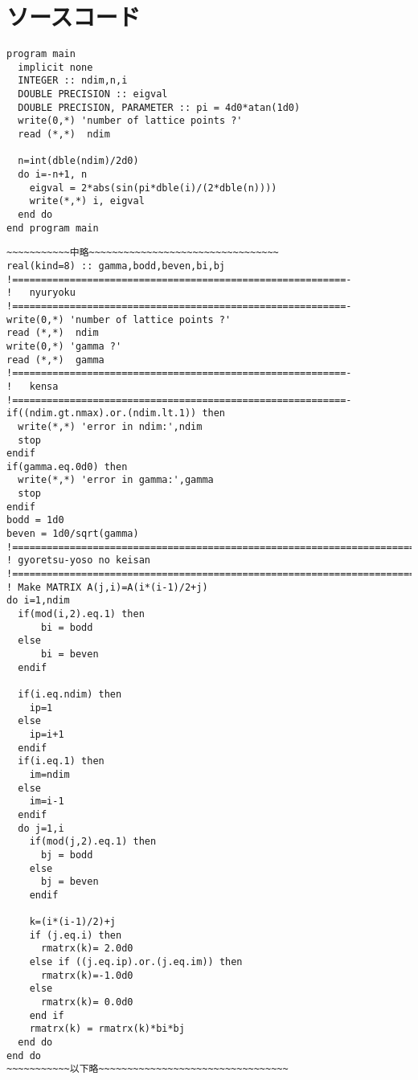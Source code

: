\appendix
\def\thesection{補遺\Alph{section}}
\renewcommand*{\thelstlisting}{\Alph{section}.\arabic{lstlisting}}
\section{ソースコード}
\begin{lstlisting}[caption=分散関係の厳密解計算プログラム,label=src5a]
program main
  implicit none
  INTEGER :: ndim,n,i
  DOUBLE PRECISION :: eigval
  DOUBLE PRECISION, PARAMETER :: pi = 4d0*atan(1d0)
  write(0,*) 'number of lattice points ?'
  read (*,*)  ndim
  
  n=int(dble(ndim)/2d0)
  do i=-n+1, n
    eigval = 2*abs(sin(pi*dble(i)/(2*dble(n))))
    write(*,*) i, eigval
  end do
end program main
\end{lstlisting}
\newpage
\begin{lstlisting}[caption=2種原子への拡張,label=src5b]
~~~~~~~~~~~中略~~~~~~~~~~~~~~~~~~~~~~~~~~~~~~~~~
real(kind=8) :: gamma,bodd,beven,bi,bj
!==========================================================-
!   nyuryoku
!==========================================================-
write(0,*) 'number of lattice points ?'
read (*,*)  ndim
write(0,*) 'gamma ?'
read (*,*)  gamma
!==========================================================-
!   kensa
!==========================================================-
if((ndim.gt.nmax).or.(ndim.lt.1)) then
  write(*,*) 'error in ndim:',ndim
  stop
endif
if(gamma.eq.0d0) then
  write(*,*) 'error in gamma:',gamma
  stop
endif
bodd = 1d0
beven = 1d0/sqrt(gamma)
!======================================================================-
! gyoretsu-yoso no keisan
!======================================================================-
! Make MATRIX A(j,i)=A(i*(i-1)/2+j)
do i=1,ndim
  if(mod(i,2).eq.1) then
      bi = bodd
  else
      bi = beven
  endif

  if(i.eq.ndim) then
    ip=1
  else
    ip=i+1
  endif
  if(i.eq.1) then
    im=ndim
  else
    im=i-1
  endif
  do j=1,i
    if(mod(j,2).eq.1) then
      bj = bodd
    else
      bj = beven
    endif

    k=(i*(i-1)/2)+j
    if (j.eq.i) then
      rmatrx(k)= 2.0d0
    else if ((j.eq.ip).or.(j.eq.im)) then
      rmatrx(k)=-1.0d0
    else
      rmatrx(k)= 0.0d0
    end if
    rmatrx(k) = rmatrx(k)*bi*bj
  end do
end do
~~~~~~~~~~~以下略~~~~~~~~~~~~~~~~~~~~~~~~~~~~~~~~~
\end{lstlisting}